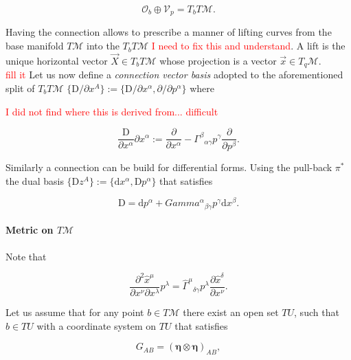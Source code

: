 \documentclass[11pt,a4paper,headinclude=true,DIV=14,BCOR=8mm,chapterprefix,listof=totoc,twoside,openright,abstracton]{scrbook}
\begin{document}
\begin{equation}
    \mathcal{O}_b\oplus \mathcal{V}_p = T_b T\mathcal{M}.
\end{equation}

Having the connection allows to prescribe a manner of lifting curves from the base manifold $T\mathcal{M}$ into the $T_b T\mathcal{M}$ \textcolor{red}{I need to fix this and understand}. A lift is the unique horizontal vector $\vec{X}\in T_bT\mathcal{M}$ whose projection is a vector $\vec{x}\in T_q\mathcal{M}$.\\ 
\textcolor{red}{fill it}
Let us now define a \textit{connection vector basis} adopted to the aforementioned split of $T_b T\mathcal{M}$ $\{\text{D}/\partial x^A \}:=\{\text{D}/\partial x^{\alpha}, \partial/\partial p^{\alpha} \}$ where 

\textcolor{red}{I did not find where this is derived from... difficult}

\begin{equation}
    \frac{\text{D}}{\partial x^{\alpha}}{\partial x^{\alpha}} := \frac{\partial}{\partial x^{\alpha}} - {\Gamma^{\beta}}_{\alpha\gamma}p^{\gamma}\frac{\partial}{\partial p^{\beta}}.
\end{equation}

Similarly a connection can be build for differential forms. Using the pull-back $\pi^*$ the dual basis $\{ \text{D}z^{A} \}:=\{\text{d}x^{\alpha}, \text{D}p^{\alpha}\}$ that satisfies 

\begin{equation}
    \text{D} = \text{d} p ^{\alpha} + {Gamma^{\alpha}}_{\beta\gamma}p^{\gamma}\text{d}x^{\beta}.
\end{equation}

\paragraph{Metric on $T\mathcal{M}$}

Note that 

\begin{equation}
    \frac{\partial^2 \hat{x}^{\mu}}{\partial x^{\nu}\partial x^{\lambda}}p^{\lambda} = {\hat{\Gamma}^{\mu}}_{\delta\gamma}p^{\lambda}\frac{\partial\hat{x}^{\delta}}{\partial x^{\nu}}.
\end{equation}

Let us assume that for any point $b\in T\mathcal{M}$ there exist an open set $TU$, such that $b\in TU$ with a coordinate system on $TU$ that satisfies

\begin{equation}
    G_{AB} = (\boldsymbol{\eta}\otimes\boldsymbol{\eta})_{AB},
\end{equation}
\end{document}

